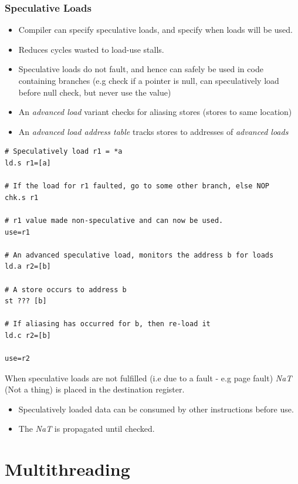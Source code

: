 \subsubsection{Speculative Loads}
\begin{itemize}
	\item Compiler can specify speculative loads, and specify when loads will be used.
	\item Reduces cycles wasted to load-use stalls.
	\item Speculative loads do not fault, and hence can safely be used in code containing branches (e.g check if a pointer is null, can speculatively load before null check, but never use the value)
	\item An \textit{advanced load} variant checks for aliasing stores (stores to same location)
	\item An \textit{advanced load address table} tracks stores to addresses of \textit{advanced loads}
\end{itemize}
\begin{verbatim}
# Speculatively load r1 = *a
ld.s r1=[a]

# If the load for r1 faulted, go to some other branch, else NOP
chk.s r1 

# r1 value made non-speculative and can now be used.
use=r1

# An advanced speculative load, monitors the address b for loads
ld.a r2=[b]

# A store occurs to address b
st ??? [b]

# If aliasing has occurred for b, then re-load it
ld.c r2=[b]

use=r2
\end{verbatim}

When speculative loads are not fulfilled (i.e due to a fault - e.g page fault) \textit{NaT} (Not a thing) is placed in the destination register.
\begin{itemize}
	\item Speculatively loaded data can be consumed by other instructions before use.
	\item The \textit{NaT} is propagated until checked.
\end{itemize}

\unfinished

\section{Multithreading}


